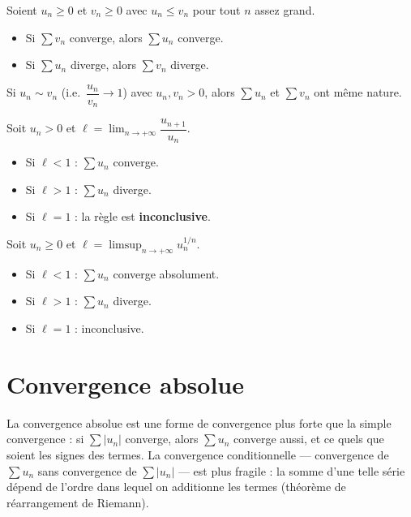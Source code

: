 \documentclass[11pt,a4paper,twoside]{book}
\begin{document}
\begin{theoremebox}
Soient $u_n \geq 0$ et $v_n \geq 0$ avec $u_n \leq v_n$ pour tout $n$ assez grand.
\begin{itemize}
  \item Si $\sum v_n$ converge, alors $\sum u_n$ converge.
  \item Si $\sum u_n$ diverge, alors $\sum v_n$ diverge.
\end{itemize}
\end{theoremebox}

\begin{theoremebox}
Si $u_n \sim v_n$ (i.e.\ $\dfrac{u_n}{v_n} \to 1$) avec $u_n, v_n > 0$,
alors $\sum u_n$ et $\sum v_n$ ont même nature.
\end{theoremebox}

\begin{theoremebox}
Soit $u_n > 0$ et $\ell = \lim_{n\to+\infty} \dfrac{u_{n+1}}{u_n}$.
\begin{itemize}
  \item Si $\ell < 1$ : $\sum u_n$ converge.
  \item Si $\ell > 1$ : $\sum u_n$ diverge.
  \item Si $\ell = 1$ : la règle est \textbf{inconclusive}.
\end{itemize}
\end{theoremebox}

\begin{theoremebox}
Soit $u_n \geq 0$ et $\ell = \limsup_{n\to+\infty} u_n^{1/n}$.
\begin{itemize}
  \item Si $\ell < 1$ : $\sum u_n$ converge absolument.
  \item Si $\ell > 1$ : $\sum u_n$ diverge.
  \item Si $\ell = 1$ : inconclusive.
\end{itemize}
\end{theoremebox}

\section{Convergence absolue}

La convergence absolue est une forme de convergence plus forte que la simple convergence : si $\sum |u_n|$ converge, alors $\sum u_n$ converge aussi, et ce quels que soient les signes des termes. La convergence conditionnelle — convergence de $\sum u_n$ sans convergence de $\sum |u_n|$ — est plus fragile : la somme d'une telle série dépend de l'ordre dans lequel on additionne les termes (théorème de réarrangement de Riemann).
\end{document}
